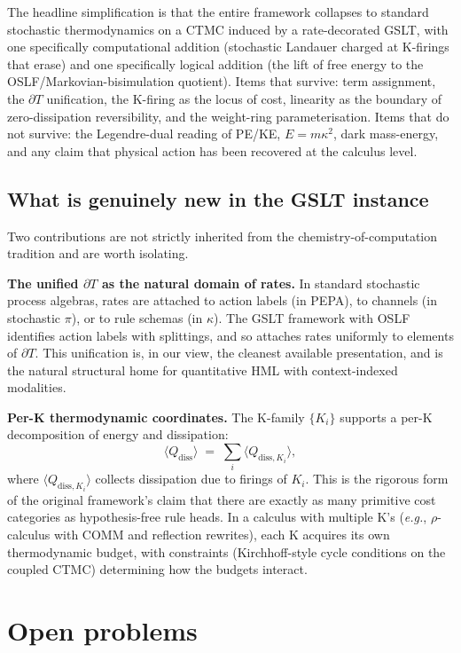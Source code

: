 \documentclass[11pt]{article}
\theoremstyle{plain}
\theoremstyle{definition}
\theoremstyle{remark}
\newcommand{\bd}{\partial}
\newcommand{\eg}{\textit{e.g.}}
\begin{document}
The headline simplification is that the entire framework collapses to standard stochastic thermodynamics on a CTMC induced by a rate-decorated GSLT, with one specifically computational addition (stochastic Landauer charged at K-firings that erase) and one specifically logical addition (the lift of free energy to the OSLF/Markovian-bisimulation quotient). Items that survive: term assignment, the $\bd T$ unification, the K-firing as the locus of cost, linearity as the boundary of zero-dissipation reversibility, and the weight-ring parameterisation. Items that do not survive: the Legendre-dual reading of PE/KE, $E = m \kappa^2$, dark mass-energy, and any claim that physical action has been recovered at the calculus level.

\subsection{What is genuinely new in the GSLT instance}

Two contributions are not strictly inherited from the chemistry-of-computation tradition and are worth isolating.

\textbf{The unified $\bd T$ as the natural domain of rates.} In standard stochastic process algebras, rates are attached to action labels (in PEPA), to channels (in stochastic $\pi$), or to rule schemas (in $\kappa$). The GSLT framework with OSLF identifies action labels with splittings, and so attaches rates uniformly to elements of $\bd T$. This unification is, in our view, the cleanest available presentation, and is the natural structural home for quantitative HML with context-indexed modalities.

\textbf{Per-K thermodynamic coordinates.} The K-family $\{K_i\}$ supports a per-K decomposition of energy and dissipation:
\[
\langle Q_{\mathrm{diss}}\rangle \;=\; \sum_i \langle Q_{\mathrm{diss}, K_i}\rangle,
\]
where $\langle Q_{\mathrm{diss}, K_i}\rangle$ collects dissipation due to firings of $K_i$. This is the rigorous form of the original framework's claim that there are exactly as many primitive cost categories as hypothesis-free rule heads. In a calculus with multiple K's (\eg, $\rho$-calculus with COMM and reflection rewrites), each K acquires its own thermodynamic budget, with constraints (Kirchhoff-style cycle conditions on the coupled CTMC) determining how the budgets interact.

\section{Open problems}\label{sec:open}
\end{document}
